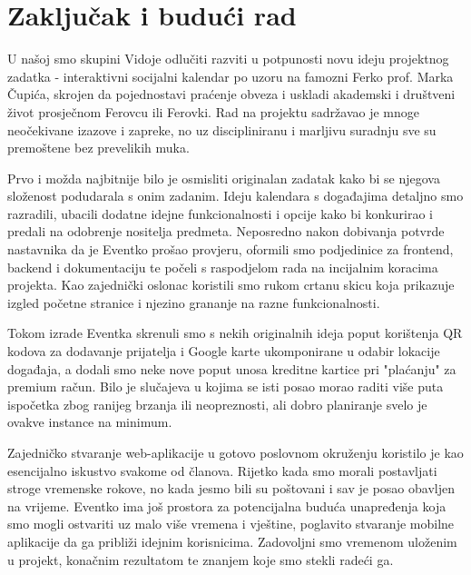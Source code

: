 \chapter{Zaključak i budući rad}
		
		\indent U našoj smo skupini Vidoje odlučiti razviti u potpunosti novu ideju projektnog zadatka - interaktivni socijalni kalendar po uzoru na famozni Ferko prof. Marka Čupića, skrojen da pojednostavi praćenje obveza i uskladi akademski i društveni život prosječnom Ferovcu ili Ferovki. Rad na projektu sadržavao je mnoge neočekivane izazove i zapreke, no uz discipliniranu i marljivu suradnju sve su premoštene bez prevelikih muka.
		
		\indent Prvo i možda najbitnije bilo je osmisliti originalan zadatak kako bi se njegova složenost podudarala s onim zadanim. Ideju kalendara s događajima detaljno smo razradili, ubacili dodatne idejne funkcionalnosti i opcije kako bi konkurirao i predali na odobrenje nositelja predmeta. Neposredno nakon dobivanja potvrde nastavnika da je Eventko prošao provjeru, oformili smo podjedinice za frontend, backend i dokumentaciju te počeli s raspodjelom rada na incijalnim koracima projekta. Kao zajednički oslonac koristili smo rukom crtanu skicu koja prikazuje izgled početne stranice i njezino grananje na razne funkcionalnosti.
		
		\indent Tokom izrade Eventka skrenuli smo s nekih originalnih ideja poput korištenja QR kodova za dodavanje prijatelja i Google karte ukomponirane u odabir lokacije događaja, a dodali smo neke nove poput unosa kreditne kartice pri "plaćanju" za premium račun. Bilo je slučajeva u kojima se isti posao morao raditi više puta ispočetka zbog ranijeg brzanja ili neopreznosti, ali dobro planiranje svelo je ovakve instance na minimum.
		
		\indent Zajedničko stvaranje web-aplikacije u gotovo poslovnom okruženju koristilo je kao esencijalno iskustvo svakome od članova. Rijetko kada smo morali postavljati stroge vremenske rokove, no kada jesmo bili su poštovani i sav je posao obavljen na vrijeme. Eventko ima još prostora za potencijalna buduća unapređenja koja smo mogli ostvariti uz malo više vremena i vještine, poglavito stvaranje mobilne aplikacije da ga približi idejnim korisnicima. Zadovoljni smo vremenom uloženim u projekt, konačnim rezultatom te znanjem koje smo stekli radeći ga.
		
		\eject 
